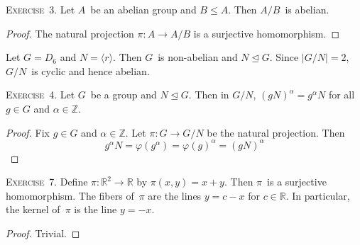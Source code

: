 \documentclass[letterpaper]{article}
\newcommand{\exercise}[1]{\goodbreak\noindent\textsc{Exercise~{#1}.}}
\newcommand{\Z}{\mathbb{Z}}
\newcommand{\R}{\mathbb{R}}
\newcommand{\subgroup}{\le}
\newcommand{\normal}{\trianglelefteq}
\newcommand{\ord}[1]{|{#1}|}
\newcommand{\gen}[1]{\langle{#1}\rangle}
\begin{document}
\exercise{3}
Let $A$~be an abelian group and $B\subgroup A$. Then $A/B$~is abelian.
\begin{proof}
The natural projection $\pi:A\to A/B$ is a surjective homomorphism.
\end{proof}
\noindent Let $G=D_6$ and $N=\gen{r}$. Then $G$~is non-abelian and $N\normal G$. Since $\ord{G/N}=2$, $G/N$~is cyclic and hence abelian.

\bigskip
\exercise{4}
Let $G$~be a group and $N\normal G$. Then in $G/N$, $(gN)^{\alpha}=g^{\alpha}N$ for all $g\in G$ and $\alpha\in\Z$.
\begin{proof}
Fix $g\in G$ and $\alpha\in\Z$. Let $\pi:G\to G/N$ be the natural projection. Then
$$g^{\alpha}N=\varphi(g^{\alpha})=\varphi(g)^{\alpha}=(gN)^{\alpha}$$
\end{proof}

\exercise{7}
Define $\pi:\R^2\to\R$ by $\pi(x,y)=x+y$. Then $\pi$~is a surjective homomorphism. The fibers of~$\pi$ are the lines $y=c-x$ for $c\in\R$. In particular, the kernel of~$\pi$ is the line $y=-x$.
\begin{proof}
Trivial.
\end{proof}
\end{document}
